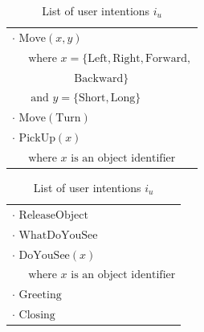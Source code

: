 \renewcommand{\arraystretch}{1.3}

\begin{table}[p!]
\begin{footnotesize}
\begin{tabular}{p{60mm}} 
$\cdot$ $\mathrm{Move}(x,y) $ \\ $ \ \ \ \ \ \text{ where } x=\{\mathrm{Left,Right,Forward,}$ \\ $\ \ \ \ \ \ \ \ \ \ \ \ \ \ \ \ \ \ \ \ \ \ \ \ \ \mathrm{Backward}\} $ \\ $ \ \ \ \ \ \ \text{ and } y = \{\mathrm{Short, Long}\}$ \\
$\cdot$ $\mathrm{Move(Turn)} $ \\
$\cdot$ $\mathrm{PickUp}(x) $ \\ $\ \ \ \ \  \text{ where } x \text{ is an object identifier}$ 
\end{tabular}
\hspace{2cm}
\begin{tabular}{p{60mm}} 
$\cdot$ $\mathrm{ReleaseObject} $ \\
$\cdot$ $\mathrm{WhatDoYouSee}$ \\
$\cdot$ $\mathrm{DoYouSee}(x) $ \\ $\ \ \ \ \  \text{ where } x \text{ is an object identifier}$ \\
$\cdot$ $\mathrm{Greeting}$ \\
$\cdot$ $\mathrm{Closing}$ 
\end{tabular}
\end{footnotesize}
 \caption{List of user intentions $i_u$} 
\label{table:userintents_exp3}
\end{table}


